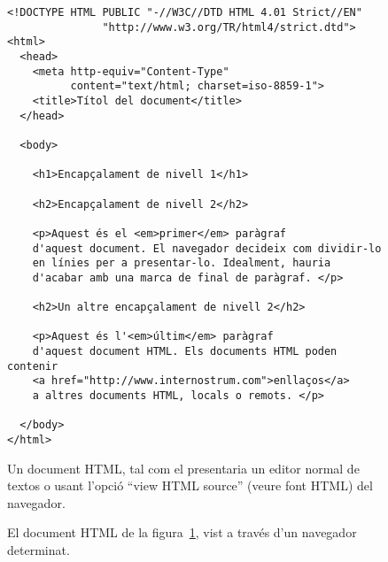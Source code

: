 \begin{figure}
\begin{center}
\begin{verbatim}
<!DOCTYPE HTML PUBLIC "-//W3C//DTD HTML 4.01 Strict//EN"
               "http://www.w3.org/TR/html4/strict.dtd">
<html>
  <head>
    <meta http-equiv="Content-Type"
          content="text/html; charset=iso-8859-1">
    <title>Títol del document</title>
  </head>

  <body>

    <h1>Encapçalament de nivell 1</h1>

    <h2>Encapçalament de nivell 2</h2>

    <p>Aquest és el <em>primer</em> paràgraf 
    d'aquest document. El navegador decideix com dividir-lo 
    en línies per a presentar-lo. Idealment, hauria 
    d'acabar amb una marca de final de paràgraf. </p>

    <h2>Un altre encapçalament de nivell 2</h2>

    <p>Aquest és l'<em>últim</em> paràgraf 
    d'aquest document HTML. Els documents HTML poden contenir 
    <a href="http://www.internostrum.com">enllaços</a> 
    a altres documents HTML, locals o remots. </p>

  </body>
</html>
\end{verbatim}
\end{center}
\caption{Un document HTML, tal com el presentaria un editor normal de
  textos o usant l'opció ``view HTML source'' (veure font HTML) del
  navegador. 
  }
\label{fg:HTML}
\end{figure}

\begin{figure}
\begin{center}
\end{center}
\caption{El document HTML de la figura~\protect\ref{fg:HTML}, vist a
  través d'un navegador determinat.}
\label{fg:HTMLnav}
\end{figure}

